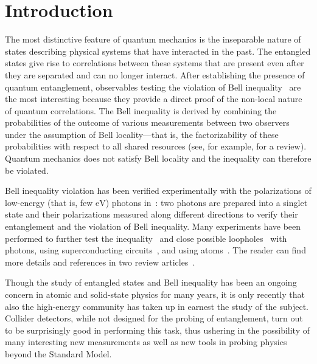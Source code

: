 \documentclass[a4paper,12pt,twocolumn]{article}
\numberwithin{equation}{section} %
\newcommand{\eV}{\ensuremath{\textrm{eV}}\xspace}
\begin{document}
\newpage
\section{Introduction}
\label{sec:Introduction}

The most distinctive feature of quantum mechanics is the inseparable nature of states describing physical systems that have interacted in the past. The entangled states give rise to correlations between these systems that are present even after they are separated and can no longer interact. After establishing the presence of quantum entanglement, observables testing the violation of Bell inequality~\cite{Bell:1964kc} are the most interesting because they provide a direct proof of the non-local nature of quantum correlations. The Bell inequality is derived by combining the probabilities of the outcome of various measurements between two observers under the assumption of Bell locality---that is, the factorizability of these probabilities with respect to all shared resources (see, for example, \cite{Brunner:RevModPhys.86.419} for a review). Quantum mechanics does not satisfy Bell locality and the inequality can therefore be violated.

Bell inequality violation has been verified experimentally with the polarizations of low-energy (that is, few \eV) photons in~\cite{Aspect:1982fx,Weihs:1998gy}: two photons are prepared into a singlet state and their polarizations measured along different directions to verify their entanglement and the violation of Bell inequality. Many experiments have been performed to further test the inequality~\cite{Clauser:1969ny,Clauser:1974tg} and close possible loopholes~\cite{Hensen:2015ccp,Giustina:2015yza} with photons, using superconducting circuits~\cite{Storz:2023jjx}, and using atoms~\cite{PhysRevLett.119.010402}. The reader can find more details and references in two review articles~\cite{Clauser:1978ng,Genovese:2005nw}.

Though the study of entangled states and Bell inequality has been an ongoing concern in atomic and solid-state physics for many years, it is only recently that also the high-energy community has taken up in earnest the study of the subject. Collider detectors, while not designed for the probing of entanglement, turn out to be surprisingly good in performing this task, thus ushering in the possibility of many interesting new measurements as well as new tools in probing physics beyond the Standard Model. 
\end{document}
